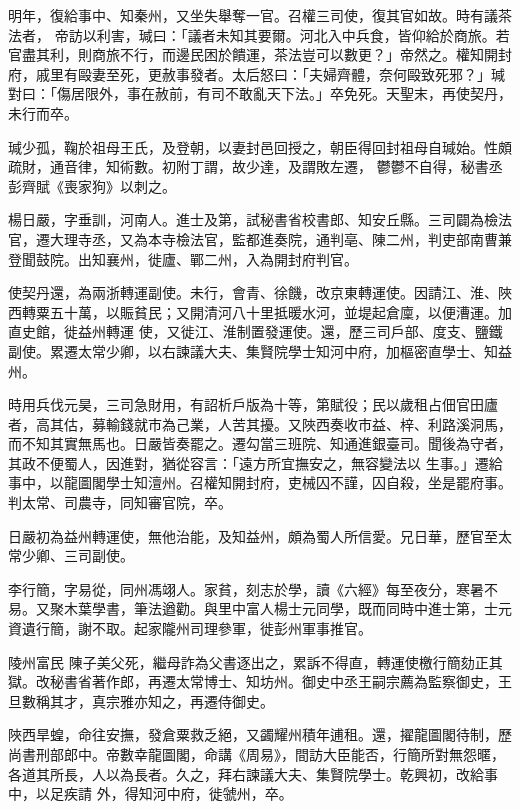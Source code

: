 \begin{pinyinscope}
 明年，復給事中、知秦州，又坐失舉奪一官。召權三司使，復其官如故。時有議茶法者，
 帝訪以利害，瑊曰：「議者未知其要爾。河北入中兵食，皆仰給於商旅。若官盡其利，則商旅不行，而邊民困於饋運，茶法豈可以數更？」帝然之。權知開封府，戚里有毆妻至死，更赦事發者。太后怒曰：「夫婦齊體，奈何毆致死邪？」瑊對曰：「傷居限外，事在赦前，有司不敢亂天下法。」卒免死。天聖末，再使契丹，未行而卒。



 瑊少孤，鞠於祖母王氏，及登朝，以妻封邑回授之，朝臣得回封祖母自瑊始。性頗疏財，通音律，知術數。初附丁謂，故少達，及謂敗左遷，
 鬱鬱不自得，秘書丞彭齊賦《喪家狗》以刺之。



 楊日嚴，字垂訓，河南人。進士及第，試秘書省校書郎、知安丘縣。三司闢為檢法官，遷大理寺丞，又為本寺檢法官，監都進奏院，通判亳、陳二州，判吏部南曹兼登聞鼓院。出知襄州，徙廬、鄲二州，入為開封府判官。



 使契丹還，為兩浙轉運副使。未行，會青、徐饑，改京東轉運使。因請江、淮、陜西轉粟五十萬，以賑貧民；又開清河八十里抵暖水河，並堤起倉廩，以便漕運。加直史館，徙益州轉運
 使，又徙江、淮制置發運使。還，歷三司戶部、度支、鹽鐵副使。累遷太常少卿，以右諫議大夫、集賢院學士知河中府，加樞密直學士、知益州。



 時用兵伐元昊，三司急財用，有詔析戶版為十等，第賦役；民以歲租占佃官田廬者，高其估，募輸錢就市為己業，人苦其擾。又陜西奏收市益、梓、利路溪洞馬，而不知其實無馬也。日嚴皆奏罷之。遷勾當三班院、知通進銀臺司。聞後為守者，其政不便蜀人，因進對，猶從容言：「遠方所宜撫安之，無容變法以
 生事。」遷給事中，以龍圖閣學士知澶州。召權知開封府，吏械囚不謹，囚自殺，坐是罷府事。判太常、司農寺，同知審官院，卒。



 日嚴初為益州轉運使，無他治能，及知益州，頗為蜀人所信愛。兄日華，歷官至太常少卿、三司副使。



 李行簡，字易從，同州馮翊人。家貧，刻志於學，讀《六經》每至夜分，寒暑不易。又聚木葉學書，筆法遒勸。與里中富人楊士元同學，既而同時中進士第，士元資遺行簡，謝不取。起家隴州司理參軍，徙彭州軍事推官。



 陵州富民
 陳子美父死，繼母詐為父書逐出之，累訴不得直，轉運使檄行簡劾正其獄。改秘書省著作郎，再遷太常博士、知坊州。御史中丞王嗣宗薦為監察御史，王旦數稱其才，真宗雅亦知之，再遷侍御史。



 陜西旱蝗，命往安撫，發倉粟救乏絕，又蠲耀州積年逋租。還，擢龍圖閣待制，歷尚書刑部郎中。帝數幸龍圖閣，命講《周易》，間訪大臣能否，行簡所對無怨暱，各道其所長，人以為長者。久之，拜右諫議大夫、集賢院學士。乾興初，改給事中，以足疾請
 外，得知河中府，徙虢州，卒。




\end{pinyinscope}
